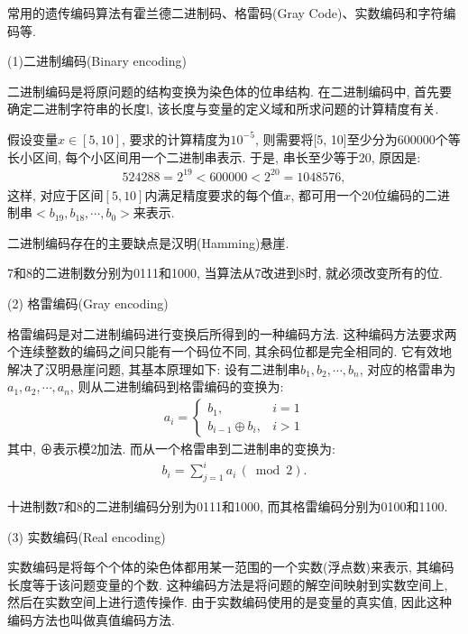 常用的遗传编码算法有霍兰德二进制码、格雷码(Gray Code)、实数编码和字符编码等.

(1)二进制编码(Binary encoding)

二进制编码是将原问题的结构变换为染色体的位串结构. 在二进制编码中, 首先要确定二进制字符串的长度l, 该长度与变量的定义域和所求问题的计算精度有关.
\begin{example}
假设变量$x\in [5,10]$, 要求的计算精度为$10^{-5}$, 则需要将[5, 10]至少分为600000个等长小区间, 每个小区间用一个二进制串表示. 于是, 串长至少等于20, 原因是:
\begin{align*}
  524288=2^{19}<600000<2^{20}=1048576,
\end{align*}
这样, 对应于区间$[5,10]$内满足精度要求的每个值$x$, 都可用一个20位编码的二进制串$<b_{19},b_{18},\cdots,b_0>$来表示.
\end{example}

二进制编码存在的主要缺点是汉明(Hamming)悬崖.

\begin{example}
  7和8的二进制数分别为0111和1000, 当算法从7改进到8时, 就必须改变所有的位.
\end{example}

 (2) 格雷编码(Gray encoding)

格雷编码是对二进制编码进行变换后所得到的一种编码方法. 这种编码方法要求两个连续整数的编码之间只能有一个码位不同, 其余码位都是完全相同的. 它有效地解决了汉明悬崖问题, 其基本原理如下:
设有二进制串$b_1,b_2,\cdots,b_n$, 对应的格雷串为$a_1,a_2,\cdots,a_n$, 则从二进制编码到格雷编码的变换为:
\begin{align}
    a_{i}=\left\{\begin{array}{ll}{b_{1},} & {i=1} \\
  {b_{i-1} \oplus b_{i}}, & {i>1}\end{array}\right.
\end{align}
其中, ⊕表示模2加法. 而从一个格雷串到二进制串的变换为:
\begin{align}
    b_{i}=\sum_{j=1}^{i} a_{i}\,(\bmod 2).
\end{align}
\begin{example}
    十进制数7和8的二进制编码分别为0111和1000, 而其格雷编码分别为0100和1100.
\end{example}

 (3) 实数编码(Real encoding)


实数编码是将每个个体的染色体都用某一范围的一个实数(浮点数)来表示, 其编码长度等于该问题变量的个数.
这种编码方法是将问题的解空间映射到实数空间上, 然后在实数空间上进行遗传操作. 由于实数编码使用的是变量的真实值, 因此这种编码方法也叫做真值编码方法.

